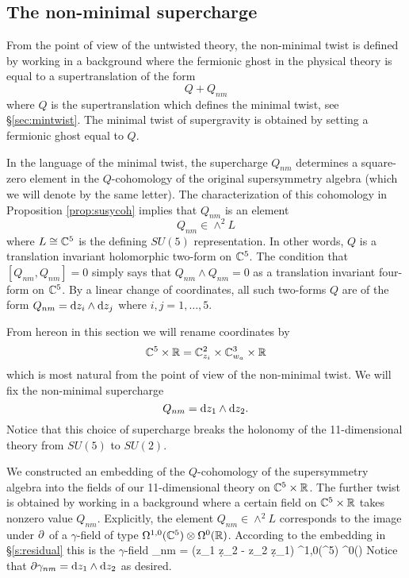 \subsection{The non-minimal supercharge}

From the point of view of the untwisted theory, the non-minimal twist is defined by working in a background where the fermionic ghost in the physical theory is equal to a supertranslation of the form
\[
Q + Q_{nm} 
\]
where $Q$ is the supertranslation which defines the minimal twist, see \S \ref{sec:mintwist}.
The minimal twist of supergravity is obtained by setting a fermionic ghost equal to $Q$. 

In the language of the minimal twist, the supercharge $Q_{nm}$ determines a square-zero element in the $Q$-cohomology of the original supersymmetry algebra (which we will denote by the same letter). 
The characterization of this cohomology in Proposition \ref{prop:susycoh} implies that $Q_{nm}$ is an element 
\[
Q_{nm} \in \wedge^2 L 
\]
where $L \cong \mathbb C^5$ is the defining $SU(5)$ representation. 
In other words, $Q$ is a translation invariant holomorphic two-form on $\mathbb C^5$. 
The condition that $[Q_{nm}, Q_{nm}] = 0$ simply says that $Q_{nm}\wedge Q_{nm} = 0$ as a translation invariant four-form on $\mathbb C^5$. 
By a linear change of coordinates, all such two-forms $Q$ are of the form $Q_{nm} = {\rm d} z_i \wedge {\rm d} z_j$ where $i,j=1,\ldots, 5$.

From hereon in this section we will rename coordinates by
\[
\mathbb C^5 \times \mathbb R = \mathbb C^2_{z_i} \times \mathbb C^3_{w_a} \times \mathbb R
\]
which is most natural from the point of view of the non-minimal twist. 
We will fix the non-minimal supercharge 
\[
Q_{nm} = {\rm d} z_1 \wedge {\rm d} z_2 .
\]
Notice that this choice of supercharge breaks the holonomy of the 11-dimensional theory from $SU(5)$ to $SU(2)$. 

We constructed an embedding of the $Q$-cohomology of the supersymmetry algebra into the fields of our 11-dimensional theory on $\mathbb C^5 \times \mathbb R$. 
The further twist is obtained by working in a background where a certain field on $\mathbb C^5 \times \mathbb R$ takes nonzero value $Q_{nm}$. 
Explicitly, the element $Q_{nm} \in \wedge^2 L$ corresponds to the image under $\partial$ of a $\gamma$-field of type $\Omega^{1,0}(\mathbb C^5) \otimes \Omega^0(\mathbb R)$. 
According to the embedding in \S \ref{s:residual} this is the $\gamma$-field 
\beqn\label{eqn:gammanm}
\gamma_{nm} =  (z_1 \d z_2 - z_2 \d z_1) \in \Omega^{1,0}(\CC^5) \otimes \Omega^0(\RR) 
\eeqn
Notice that $\partial \gamma_{nm} = {\rm d} z_1 \wedge {\rm d} z_2$ as desired.


